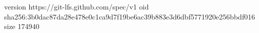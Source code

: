 version https://git-lfs.github.com/spec/v1
oid sha256:3b0dac87da28e478e0c1ca9d7f19be6ac39b883e3d6dbf5771920e256bbdf016
size 174940
